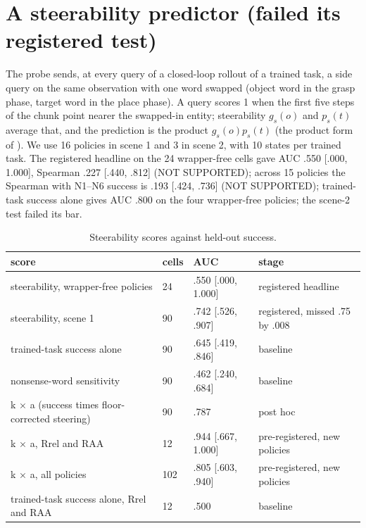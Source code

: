 \section{A steerability predictor (failed its registered test)}
\label{app:G}

The probe sends, at every query of a closed-loop rollout of a trained task, a side query on the same observation with one word swapped (object word in the grasp phase, target word in the place phase). A query scores 1 when the first five steps of the chunk point nearer the swapped-in entity; steerability $g_s(o)$ and $p_s(t)$ average that, and the prediction is the product $g_s(o) p_s(t)$ (the product form of \citealt{okawa2310}). We use 16 policies in scene 1 and 3 in scene 2, with 10 states per trained task. The registered headline on the 24 wrapper-free cells gave AUC .550 [.000, 1.000], Spearman .227 [\mi.440, .812] (NOT SUPPORTED); across 15 policies the Spearman with N1--N6 success is .193 [\mi.424, .736] (NOT SUPPORTED); trained-task success alone gives AUC .800 on the four wrapper-free policies; the scene-2 test failed its bar.

\begin{table}[h]
\caption{Steerability scores against held-out success.}
\label{tab:G1}
\centering
\footnotesize
\begin{tabular}{@{}llll@{}}
\toprule
score & cells & AUC & stage \\
\midrule
steerability, wrapper-free policies & 24 & .550 [.000, 1.000] & registered headline \\
steerability, scene 1 & 90 & .742 [.526, .907] & registered, missed .75 by .008 \\
trained-task success alone & 90 & .645 [.419, .846] & baseline \\
nonsense-word sensitivity & 90 & .462 [.240, .684] & baseline \\
k $\times$ a (success times floor-corrected steering) & 90 & .787 & post hoc \\
k $\times$ a, Rrel and RAA & 12 & .944 [.667, 1.000] & pre-registered, new policies \\
k $\times$ a, all policies & 102 & .805 [.603, .940] & pre-registered, new policies \\
trained-task success alone, Rrel and RAA & 12 & .500 & baseline \\
\bottomrule
\end{tabular}
\end{table}

